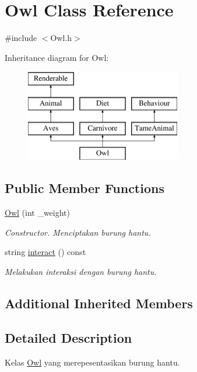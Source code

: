 \hypertarget{classOwl}{\section{Owl Class Reference}
\label{classOwl}
}


{\ttfamily \#include $<$Owl.\+h$>$}

Inheritance diagram for Owl\+:\begin{figure}[H]
\begin{center}
\leavevmode
\includegraphics[height=4.000000cm]{classOwl}
\end{center}
\end{figure}
\subsection*{Public Member Functions}
\begin{DoxyCompactItemize}
\item 
\hypertarget{classOwl_adbe3753bae7d7fd91fd10705468b67c0}{\hyperlink{classOwl_adbe3753bae7d7fd91fd10705468b67c0}{Owl} (int \+\_\+weight)}\label{classOwl_adbe3753bae7d7fd91fd10705468b67c0}

\begin{DoxyCompactList}\small\item\em Constructor. Menciptakan burung hantu. \end{DoxyCompactList}\item 
string \hyperlink{classOwl_a36e657b217e4dcc09321c3740a904d22}{interact} () const 
\begin{DoxyCompactList}\small\item\em Melakukan interaksi dengan burung hantu. \end{DoxyCompactList}\end{DoxyCompactItemize}
\subsection*{Additional Inherited Members}


\subsection{Detailed Description}
Kelas \hyperlink{classOwl}{Owl} yang merepesentasikan burung hantu. 


